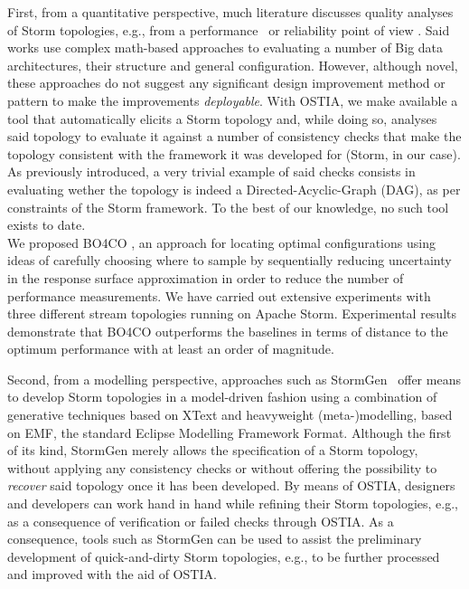 First, from a quantitative perspective, much literature discusses quality analyses of Storm topologies, e.g., from a performance~\cite{perfbd} or reliability point of view \cite{bigdatareliab}. Said works use complex math-based approaches to evaluating a number of Big data architectures, their structure and general configuration. However, although novel, these approaches do not suggest any significant design improvement method or pattern to make the improvements \emph{deployable}. With OSTIA, we make available a tool that automatically elicits a Storm topology and, while doing so, analyses said topology to evaluate it against a number of consistency checks that make the topology consistent with the framework it was developed for (Storm, in our case). As previously introduced, a very trivial example of said checks consists in evaluating wether the topology is indeed a Directed-Acyclic-Graph (DAG), as per constraints of the Storm framework.  To the best of our knowledge, no such tool exists to date. \\


We proposed {\small \sf BO4CO} \cite{jamshidi-vldb}, an approach for locating optimal configurations using ideas of carefully choosing where to sample by sequentially reducing uncertainty in the response surface approximation in order to reduce the number of performance measurements. We have carried out extensive experiments with three different stream topologies running on Apache Storm. Experimental results demonstrate that {\small \sf BO4CO} outperforms the baselines in terms of distance to the optimum performance with at least an order of magnitude. 

Second, from a modelling perspective, approaches such as StormGen~\cite{stormgen} offer means to develop Storm topologies in a model-driven fashion using a combination of generative techniques based on XText and heavyweight (meta-)modelling, based on EMF, the standard Eclipse Modelling Framework Format. Although the first of its kind, StormGen merely allows the specification of a Storm topology, without applying any consistency checks or without offering the possibility to \emph{recover} said topology once it has been developed. By means of OSTIA, designers and developers can work hand in hand while refining their Storm topologies, e.g., as a consequence of verification or failed checks through OSTIA. As a consequence, tools such as StormGen can be used to assist the preliminary development of quick-and-dirty Storm topologies, e.g., to be further processed and improved with the aid of OSTIA.

